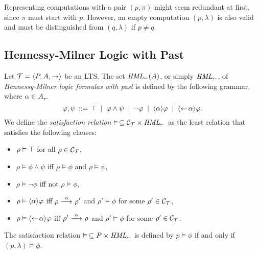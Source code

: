 \begin{remark}
    Representing computations with a pair $(p,\pi)$ might seem redundant at
    first, since $\pi$ must start with $p$. However, an empty computation
    $(p,\lambda)$ is also valid and must be distinguished from $(q,\lambda)$
    if $p\ne q$.
\end{remark}

\subsection{Hennessy-Milner Logic with Past}


\begin{definition}
    Let $\mathcal{T}=\langle P,A,\rightarrow \rangle$ be an LTS. The set $\textit{HML}_\shortleftarrow(A)$,
    or simply $\textit{HML}_\shortleftarrow$, of
    \emph{Hennessy-Milner logic formulas with past} is defined by the following grammar,
    where $\alpha\in A_\tau$.
    \[
        \varphi,\psi \,::=\, \top \;\;|\;\; \varphi\land\psi
                                \;\;|\;\; \neg\varphi
                                \;\;|\;\; \mbox{\ensuremath{\langle \alpha \rangle}} \varphi
                                \;\;|\;\; \mbox{\ensuremath{\langle\leftarrow\! \alpha \rangle}} \varphi.
    \]
    We define the \emph{satisfaction relation} $\vDash\,\subseteq \mathcal{C}_{\mathcal{T}} \times \textit{HML}_\shortleftarrow$
    as the least relation that satisfies the following clauses:
    \begin{itemize}
        \item $\rho\vDash\top$ for all $\rho\in\mathcal{C}_{\mathcal{T}}$,
        \item $\rho\vDash\phi\land\psi$ iff $\rho\vDash\phi$ and $\rho\vDash\psi$,
        \item $\rho\vDash\neg\phi$ iff not $\rho\vDash\phi$,
        \item $\rho\vDash\mbox{\ensuremath{\langle \alpha \rangle}}\varphi$ iff
              $\rho\ {\stackrel{{\alpha}}{\longrightarrow}}\ \rho'$ and $\rho'\vDash\phi$ for some $\rho'\in\mathcal{C}_{\mathcal{T}}$,
        \item $\rho\vDash\mbox{\ensuremath{\langle\leftarrow\! \alpha \rangle}}\varphi$ iff
              $\rho'\ {\stackrel{{\alpha}}{\longrightarrow}}\ \rho$ and $\rho'\vDash\phi$ for some $\rho'\in\mathcal{C}_{\mathcal{T}}$.
    \end{itemize}
    The satisfaction relation $\vDash\,\subseteq P\times\textit{HML}_\shortleftarrow$ is defined by
    $p\vDash\phi$ if and only if $(p,\lambda)\vDash \phi$.
\end{definition}

